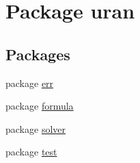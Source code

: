 \hypertarget{namespaceuran}{}\section{Package uran}
\label{namespaceuran}
\subsection*{Packages}
\begin{DoxyCompactItemize}
\item 
package \hyperlink{namespaceuran_1_1err}{err}
\item 
package \hyperlink{namespaceuran_1_1formula}{formula}
\item 
package \hyperlink{namespaceuran_1_1solver}{solver}
\item 
package \hyperlink{namespaceuran_1_1test}{test}
\end{DoxyCompactItemize}
